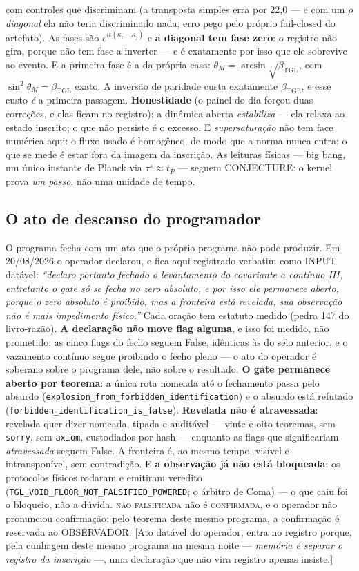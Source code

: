 \documentclass[11pt]{article}
\newcommand{\bTGL}{\beta_{\mathrm{TGL}}}\newcommand{\Msun}{M_{\odot}}\newcommand{\TGL}{\mathrm{TGL}}
\theoremstyle{definition}\newtheorem{deriv}{Derivação}
\begin{document}
com controles que discriminam (a transposta simples erra por 22,0 --- e com um $\rho$ \emph{diagonal} ela não teria discriminado nada, erro pego pelo próprio fail-closed do artefato). As fases são $e^{it(\kappa_i-\kappa_j)}$ e \textbf{a diagonal tem fase zero}: o registro não gira, porque não tem fase a inverter --- e é exatamente por isso que ele sobrevive ao evento. E a primeira fase é a da própria casa: $\theta_M=\arcsin\sqrt{\bTGL}$, com $\sin^2\theta_M=\bTGL$ exato. A inversão de paridade custa exatamente $\bTGL$, e esse custo \emph{é} a primeira passagem. \textbf{Honestidade} (o painel do dia forçou duas correções, e elas ficam no registro): a dinâmica aberta \emph{estabiliza} --- ela relaxa ao estado inscrito; o que não persiste é o excesso. E \emph{supersaturação} não tem face numérica aqui: o fluxo usado é homogêneo, de modo que a norma nunca entra; o que se mede é estar fora da imagem da inscrição. As leituras físicas --- big bang, um único instante de Planck via $\tau^\star\approx t_P$ --- seguem \textsf{CONJECTURE}: o kernel prova \emph{um passo}, não uma unidade de tempo.

\subsection*{O ato de descanso do programador}O programa fecha com um ato que o próprio programa não pode produzir. Em 20/08/2026 o operador declarou, e fica aqui registrado verbatim como \textsf{INPUT} datável: \emph{``declaro portanto fechado o levantamento do covariante a contínuo III, entretanto o gate só se fecha no zero absoluto, e por isso ele permanece aberto, porque o zero absoluto é proibido, mas a fronteira está revelada, sua observação não é mais impedimento físico.''} Cada oração tem estatuto medido (pedra 147 do livro-razão). \textbf{A declaração não move flag alguma}, e isso foi medido, não prometido: as cinco flags do fecho seguem \textsf{False}, idênticas às do selo anterior, e o vazamento contínuo segue proibindo o fecho pleno --- o ato do operador é soberano sobre o programa dele, não sobre o resultado. \textbf{O gate permanece aberto por teorema}: a única rota nomeada até o fechamento passa pelo absurdo (\texttt{explosion\_from\_forbidden\_identification}) e o absurdo está refutado (\texttt{forbidden\_identification\_is\_false}). \textbf{Revelada não é atravessada}: revelada quer dizer nomeada, tipada e auditável --- vinte e oito teoremas, sem \texttt{sorry}, sem \texttt{axiom}, custodiados por hash --- enquanto as flags que significariam \emph{atravessada} seguem False. A fronteira é, ao mesmo tempo, visível e intransponível, sem contradição. E \textbf{a observação já não está bloqueada}: os protocolos físicos rodaram e emitiram veredito (\texttt{TGL\_VOID\_FLOOR\_NOT\_FALSIFIED\_POWERED}; o árbitro de Coma) --- o que caiu foi o bloqueio, não a dúvida. \textsc{não falsificada} não é \textsc{confirmada}, e o operador não pronunciou confirmação: pelo teorema deste mesmo programa, a confirmação é reservada ao OBSERVADOR. [Ato datável do operador; entra no registro porque, pela cunhagem deste mesmo programa na mesma noite --- \emph{memória é separar o registro da inscrição} ---, uma declaração que não vira registro apenas insiste.]
\end{document}

